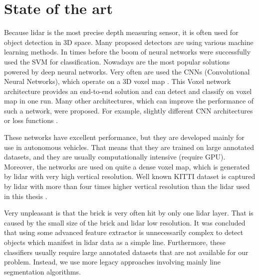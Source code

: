 \section{State of the art}
Because lidar is the most precise depth measuring sensor, it is often used for object detection in 3D space. Many proposed detectors are using various machine learning methods. In times before the boom of neural networks were successfully used the SVM for classification\cite{himmelsbach2008}. Nowadays are the most popular solutions powered by deep neural networks. Very often are used the CNNs (Convolutional Neural Networks), which operate on a 3D voxel map \cite{zhou2017}. This Voxel network architecture provides an end-to-end solution and can detect and classify on voxel map in one run. Many other architectures, which can improve the performance of such a network, were proposed. For example, slightly different CNN architectures or loss functions \cite{yan2018}. 

These networks have excellent performance, but they are developed mainly for use in autonomous vehicles. That means that they are trained on large annotated datasets, and they are usually computationally intensive (require GPU). Moreover, the networks are used on quite a dense voxel map, which is generated by lidar with very high vertical resolution. Well known KITTI dataset is captured by lidar with more than four times higher vertical resolution than the lidar used in this thesis \cite{geiger2013}.

Very unpleasant is that the brick is very often hit by only one lidar layer. That is caused by the small size of the brick and lidar low resolution. It was concluded that using some advanced feature extractor is unnecessarily complex to detect objects which manifest in lidar data as a simple line. Furthermore, these classifiers usually require large annotated datasets that are not available for our problem. Instead, we use more legacy approaches involving mainly line segmentation algorithms.

